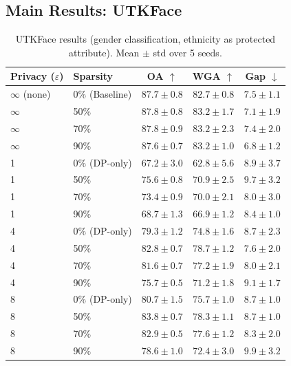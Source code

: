 \documentclass{article}
\begin{document}
\subsection{Main Results: UTKFace}
\label{sec:results_utkface}

\begin{table}[t]
\caption{UTKFace results (gender classification, ethnicity as protected attribute). Mean $\pm$ std over 5 seeds.}
\label{tab:utkface_main}
\centering
\small
\begin{tabular}{llccc}
\toprule
Privacy ($\varepsilon$) & Sparsity & OA $\uparrow$ & WGA $\uparrow$ & Gap $\downarrow$ \\
\midrule
$\infty$ (none) & 0\% (Baseline) & $87.7 \pm 0.8$ & $82.7 \pm 0.8$ & $7.5 \pm 1.1$ \\
\midrule
$\infty$ & 50\% & $87.8 \pm 0.8$ & $83.2 \pm 1.7$ & $7.1 \pm 1.9$ \\
$\infty$ & 70\% & $87.8 \pm 0.9$ & $83.2 \pm 2.3$ & $7.4 \pm 2.0$ \\
$\infty$ & 90\% & $87.6 \pm 0.7$ & $83.2 \pm 1.0$ & $6.8 \pm 1.2$ \\
\midrule
1 & 0\% (DP-only) & $67.2 \pm 3.0$ & $62.8 \pm 5.6$ & $8.9 \pm 3.7$ \\
1 & 50\% & $75.6 \pm 0.8$ & $70.9 \pm 2.5$ & $9.7 \pm 3.2$ \\
1 & 70\% & $73.4 \pm 0.9$ & $70.0 \pm 2.1$ & $8.0 \pm 3.0$ \\
1 & 90\% & $68.7 \pm 1.3$ & $66.9 \pm 1.2$ & $8.4 \pm 1.0$ \\
\midrule
4 & 0\% (DP-only) & $79.3 \pm 1.2$ & $74.8 \pm 1.6$ & $8.7 \pm 2.3$ \\
4 & 50\% & $82.8 \pm 0.7$ & $78.7 \pm 1.2$ & $7.6 \pm 2.0$ \\
4 & 70\% & $81.6 \pm 0.7$ & $77.2 \pm 1.9$ & $8.0 \pm 2.1$ \\
4 & 90\% & $75.7 \pm 0.5$ & $71.2 \pm 1.8$ & $9.1 \pm 1.7$ \\
\midrule
8 & 0\% (DP-only) & $80.7 \pm 1.5$ & $75.7 \pm 1.0$ & $8.7 \pm 1.0$ \\
8 & 50\% & $83.8 \pm 0.7$ & $78.3 \pm 1.1$ & $8.7 \pm 1.0$ \\
8 & 70\% & $82.9 \pm 0.5$ & $77.6 \pm 1.2$ & $8.3 \pm 2.0$ \\
8 & 90\% & $78.6 \pm 1.0$ & $72.4 \pm 3.0$ & $9.9 \pm 3.2$ \\
\bottomrule
\end{tabular}
\end{table}
\end{document}
